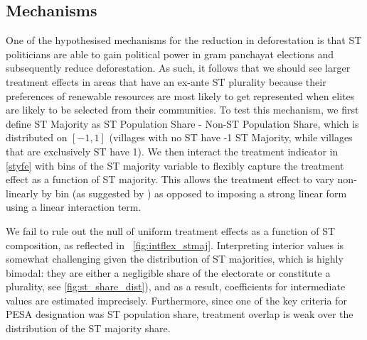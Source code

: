\documentclass[12pt,reqno]{article}
\begin{document}
\subsection{Mechanisms} %
\label{ssub:possible_mechanisms}

One of the hypothesised mechanisms for the reduction in deforestation is that ST politicians are able to gain political power in gram panchayat elections and subsequently reduce deforestation. As such, it follows that we should see larger treatment effects in areas that have an ex-ante ST plurality because their preferences of renewable resources are most likely to get represented when elites are likely to be selected from their communities. To test this mechanism, we first define ST Majority as ST Population Share - Non-ST Population Share, which is distributed on $[-1, 1]$ (villages with no ST have -1 ST Majority, while villages that are exclusively ST have 1). We then interact the treatment indicator in \ref{styfe} with bins of the ST majority variable to flexibly capture the treatment effect as a function of ST majority. This allows the treatment effect to vary non-linearly by bin (as suggested by \parencite{hainmueller2019much}) as opposed to imposing a strong linear form using a linear interaction term. 

We fail to rule out the null of uniform treatment effects as a function of ST composition, as reflected in ~\ref{fig:intflex_stmaj}. Interpreting interior values is somewhat challenging given the distribution of ST majorities, which is highly bimodal: they are either a negligible share of the electorate or constitute a plurality, see \ref{fig:st_share_dist}), and as a result, coefficients for intermediate values are estimated imprecisely. Furthermore, since one of the key criteria for PESA designation was ST population share, treatment overlap is weak over the distribution of the ST majority share.


%   
\end{document}

